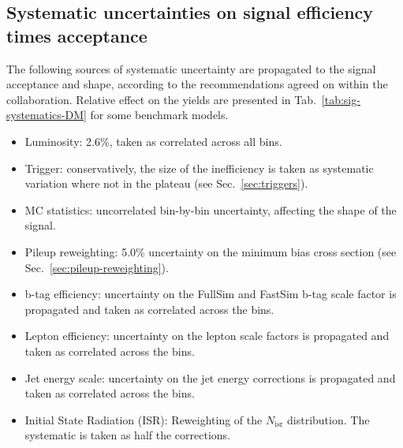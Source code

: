 
\clearpage
\subsection{Systematic uncertainties on signal efficiency times acceptance}
\label{sec:sig-syst-DM}

The following sources of systematic uncertainty are propagated to the signal
acceptance and shape, according to the recommendations agreed on within the
collaboration. Relative effect on the yields are presented in
Tab.~\ref{tab:sig-systematics-DM} for some benchmark models.

\begin{itemize}
    \item Luminosity: 2.6\%, taken as correlated across all bins.
    \item Trigger: conservatively, the size of the inefficiency is taken as
        systematic variation where not in the plateau (see Sec.~\ref{sec:triggers}).
    \item MC statistics:  uncorrelated bin-by-bin uncertainty, affecting the
        shape of the signal.
    \item Pileup reweighting: 5.0\% uncertainty on the minimum bias cross section
        (see Sec.~\ref{sec:pileup-reweighting}).
    \item b-tag efficiency: uncertainty on the FullSim and FastSim b-tag scale
        factor is propagated and taken as correlated across the bins.
    \item Lepton efficiency: uncertainty on the lepton scale factors is
        propagated and taken as correlated across the bins.
    \item Jet energy scale: uncertainty on the jet energy corrections is
        propagated and taken as correlated across the bins.
    \item Initial State Radiation (ISR): Reweighting of the $N_{\text{isr}}$
        distribution. The systematic is taken as half the corrections.
\end{itemize}

